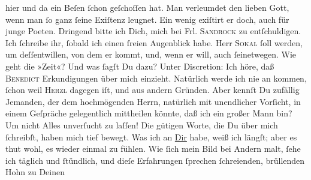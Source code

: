 \begin{ledgroupsized}[t]{13cm}
               hier und da ein Beſen ſchon geſchoſſen hat. Man 
               verleumdet den lieben Gott, wenn man ſo ganz ſeine Exiſtenz leugnet. Ein wenig
               exiſtirt er doch, auch für junge Poeten.\pend
           \pstart
           Dringend bitte ich Dich, mich bei Frl. \textsc{Sandrock} zu entſchuldigen. Ich ſchreibe ihr, ſobald ich einen ſreien Augenblick
               habe.\pend
           \pstart
           Herr \textsc{Sokal} ſoll \label{K_L02622_8v}\label{K_L02622_8h} werden, {\pb}um deſſentwillen, von dem er kommt, und, wenn er
               will, auch ſeinetwegen.\pend
           \pstart
           Wie geht die »Zeit«? Und was ſagſt Du dazu?\pend
           \pstart
           Unter Discretion: Ich höre, daß \textsc{Benedict} Erkundigungen über mich einzieht. Natürlich werde ich nie an \label{K_L02622_9v}\label{K_L02622_9h} kommen, ſchon weil \textsc{Herzl} dagegen iſt, und aus andern Gründen. Aber kennſt Du zufällig Jemanden, der dem
               hochmögenden Herrn, natürlich mit unendlicher
               Vorſicht, in einem Geſpräche gelegentlich mittheilen könnte, {\pb}daß ich ein großer Mann bin? Um nicht Alles
               unverſucht zu laſſen!\pend
           \pstart
           Die gütigen Worte, die Du über mich ſchreibſt, haben mich tief bewegt. Was ich an \uline{Dir} habe, weiß ich längſt; aber es thut wohl, es
               wieder einmal zu fühlen. Wie ſich mein Bild bei Andern malt, ſehe ich täglich und
               ſtündlich, und dieſe Erfahrungen ſprechen ſchreienden, brüllenden Hohn zu Deinen

\end{ledgroupsized}
